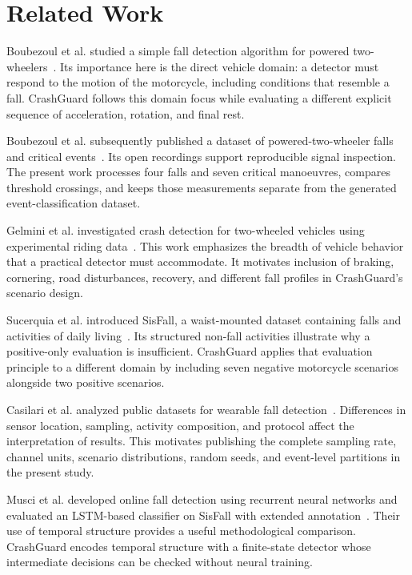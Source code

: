 \documentclass[10pt,a4paper]{article}
\begin{document}
\section{Related Work}
Boubezoul et al. studied a simple fall detection algorithm for powered two-wheelers~\cite{boubezoul2013algorithm}. Its importance here is the direct vehicle domain: a detector must respond to the motion of the motorcycle, including conditions that resemble a fall. CrashGuard follows this domain focus while evaluating a different explicit sequence of acceleration, rotation, and final rest.

Boubezoul et al. subsequently published a dataset of powered-two-wheeler falls and critical events~\cite{boubezoul2019dataset}. Its open recordings support reproducible signal inspection. The present work processes four falls and seven critical manoeuvres, compares threshold crossings, and keeps those measurements separate from the generated event-classification dataset.

Gelmini et al. investigated crash detection for two-wheeled vehicles using experimental riding data~\cite{gelmini2021novel}. This work emphasizes the breadth of vehicle behavior that a practical detector must accommodate. It motivates inclusion of braking, cornering, road disturbances, recovery, and different fall profiles in CrashGuard's scenario design.

Sucerquia et al. introduced SisFall, a waist-mounted dataset containing falls and activities of daily living~\cite{sisfall}. Its structured non-fall activities illustrate why a positive-only evaluation is insufficient. CrashGuard applies that evaluation principle to a different domain by including seven negative motorcycle scenarios alongside two positive scenarios.

Casilari et al. analyzed public datasets for wearable fall detection~\cite{survey}. Differences in sensor location, sampling, activity composition, and protocol affect the interpretation of results. This motivates publishing the complete sampling rate, channel units, scenario distributions, random seeds, and event-level partitions in the present study.

Musci et al. developed online fall detection using recurrent neural networks and evaluated an LSTM-based classifier on SisFall with extended annotation~\cite{musci}. Their use of temporal structure provides a useful methodological comparison. CrashGuard encodes temporal structure with a finite-state detector whose intermediate decisions can be checked without neural training.
\end{document}
